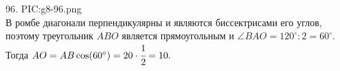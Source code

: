 96. {{PIC:g8-96.png}}\\
В ромбе диагонали перпендикулярны и являются биссектрисами его углов, поэтому треугольник $ABO$ является прямоугольным и $\angle BAO=120^\circ:2=60^\circ.$ Тогда $AO=AB\cos(60^\circ)=20\cdot\cfrac{1}{2}=10.$\\
